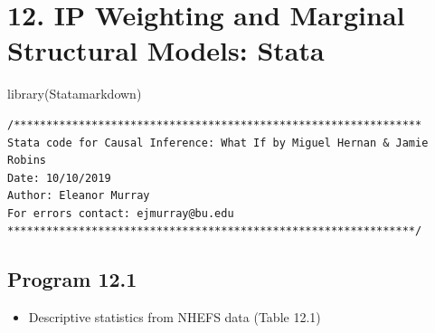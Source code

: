 \documentclass[
  10pt,
  a4paper,
]{book}
\newenvironment{Shaded}{\begin{snugshade}}{\end{snugshade}}
\newcommand{\FunctionTok}[1]{\textcolor[rgb]{0.28,0.35,0.67}{#1}}
\newcommand{\NormalTok}[1]{\textcolor[rgb]{0.00,0.46,0.62}{#1}}
\providecommand{\tightlist}{%
  \setlength{\itemsep}{0pt}\setlength{\parskip}{0pt}}
\begin{document}
\chapter*{12. IP Weighting and Marginal Structural Models: Stata}\label{ip-weighting-and-marginal-structural-models-stata}

\begin{Shaded}
\begin{Highlighting}[]
\FunctionTok{library}\NormalTok{(Statamarkdown)}
\end{Highlighting}
\end{Shaded}

\begin{verbatim}
/***************************************************************
Stata code for Causal Inference: What If by Miguel Hernan & Jamie Robins
Date: 10/10/2019
Author: Eleanor Murray 
For errors contact: ejmurray@bu.edu
***************************************************************/
\end{verbatim}

\section{Program 12.1}\label{program-12.1-1}

\begin{itemize}
\tightlist
\item
  Descriptive statistics from NHEFS data (Table 12.1)
\end{itemize}
\end{document}
